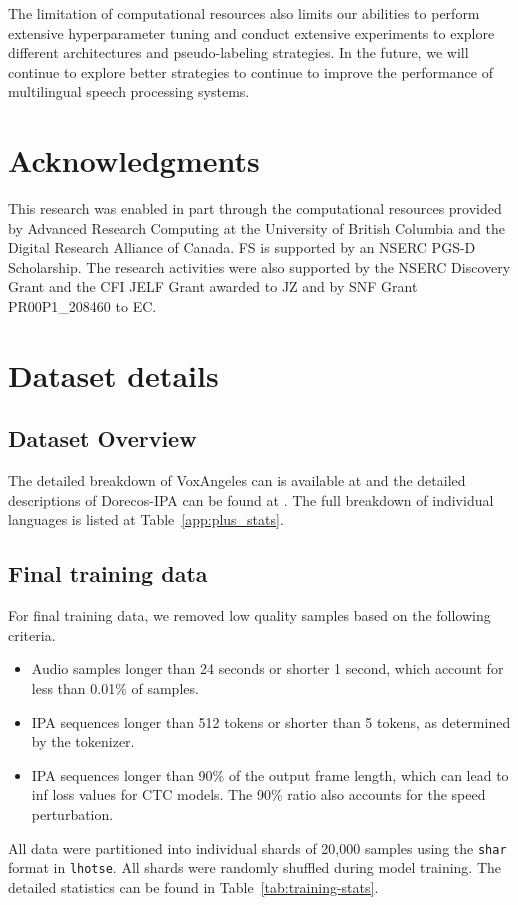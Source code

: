\documentclass[11pt]{article}
\begin{document}
The limitation of computational resources also limits our abilities to perform extensive hyperparameter tuning and conduct extensive experiments to explore different architectures and pseudo-labeling strategies. In the future, we will continue to explore better strategies to continue to improve the performance of multilingual speech processing systems. 

\section*{Acknowledgments}
This research was enabled in part through the computational resources provided by Advanced Research Computing at the University of British Columbia and the Digital Research Alliance of Canada. FS is supported by an NSERC PGS-D Scholarship. The research activities were also supported by the NSERC Discovery Grant and the CFI JELF Grant awarded to JZ and by SNF Grant  PR00P1\_208460 to EC.

%


\appendix
\newpage
\onecolumn
\section{Dataset details}
\label{app:dataset}
\subsection{Dataset Overview}

{\centering{\small 
}}

\twocolumn
The detailed breakdown of VoxAngeles can is available at \citet{chodroff-etal-2024-phonetic} and the detailed descriptions of Dorecos-IPA can be found at \citet{zhu-etal-2024-taste}. The full breakdown of individual languages is listed at Table~\ref{app:plus_stats}. 

\subsection{Final training data}
For final training data, we removed low quality samples based on the following criteria.
\begin{itemize}
    \item Audio samples longer than 24 seconds or shorter 1 second, which account for less than 0.01\% of samples.
    \item IPA sequences longer than 512 tokens or shorter than 5 tokens, as determined by the tokenizer. 
    \item IPA sequences longer than 90\% of the output frame length, which can lead to inf loss values for CTC models. The 90\% ratio also accounts for the speed perturbation. 
\end{itemize}
All data were partitioned into individual shards of 20,000 samples using the \texttt{shar} format in \texttt{lhotse}. All shards were randomly shuffled during model training. The detailed statistics can be found in Table~\ref{tab:training-stats}.
\end{document}
